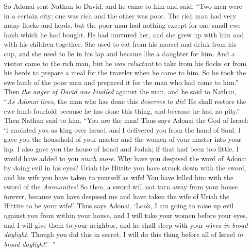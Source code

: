 \begin{biblechapter} %
 So Adonai sent Nathan to David, and he came to him and said, “Two men were in a certain city; one was rich and the other was poor.
\verse The rich man had very many flocks and herds,
\verse but the poor man had nothing except for one small ewe lamb which he had bought. He had nurtured her, and she grew up with him and with his children together. She used to eat from his morsel and drink from his cup, and she used to lie in his lap and became like a daughter for him.
\verse And a visitor came to the rich man, but he \textit{was reluctant} to take from his flocks or from his herds to prepare a meal for the traveler when he came to him. So he took the ewe lamb of the poor man and prepared it for the man who had come to him.”
\verse Then \textit{the anger of David was kindled} against the man, and he said to Nathan, “\textit{As Adonai lives}, the man who has done this \textit{deserves to die}!
\verse He shall restore the ewe lamb fourfold because he has done this thing, and because he had no pity.”
\verse Then Nathan said to him, “You are the man! Thus says Adonai the God of Israel: ‘I anointed you as king over Israel, and I delivered you from the hand of Saul.
\verse I gave you the household of your master and the women of your master into your lap. I also gave you the house of Israel and Judah; if that had been too little, I would have added to you \textit{much more}.
\verse Why have you despised the word of Adonai by doing evil in his eyes? Uriah the Hittite you have struck down with the sword, and his wife you have taken to yourself as wife! You have killed him with the sword of the \textit{Ammonites}!
\verse So then, a sword will not turn away from your house forever, because you have despised me and have taken the wife of Uriah the Hittite to be your wife!’
\verse Thus says Adonai, ‘Look, I am going to raise up evil against you from within your house, and I will take your women before your eyes, and I will give them to your neighbor, and he shall sleep with your wives \textit{in broad daylight}.
\verse Though you did this in secret, I will do this thing before all of Israel \textit{in broad daylight}!’ ”

\end{biblechapter}
